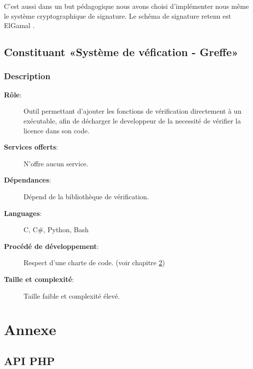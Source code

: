C'est aussi dans un but pédagogique nous avons choisi d'implémenter nous même le système cryptographique de signature. Le schéma de signature retenu est ElGamal \cite{ElGamal}.

\section{Constituant «Système de véfication - Greffe»}
\subsection{Description}
\begin{description}
	\item[\textbf{Rôle}:]
			Outil permettant d'ajouter les fonctions de vérification directement à un
			exécutable, afin de décharger le developpeur de la necessité de vérifier 
			la licence dans son code.
	\item[\textbf{Services offerts}:]
		N'offre aucun service.
	\item[\textbf{Dépendances}:]
		Dépend de la bibliothèque de vérification.
	\item[\textbf{Languages}:]
		C, C\#, Python, Bash 
	\item[\textbf{Procédé de développement}:]
		Respect d'une charte de code. (voir chapitre \ref{chap:Annexe}) 
	\item[\textbf{Taille et complexité}:]
		Taille faible et complexité élevé.
\end{description}


\chapter{Annexe}
\label{chap:Annexe}



\section{API PHP}
\label{section:php}
\inputminted{php}{api.php}
